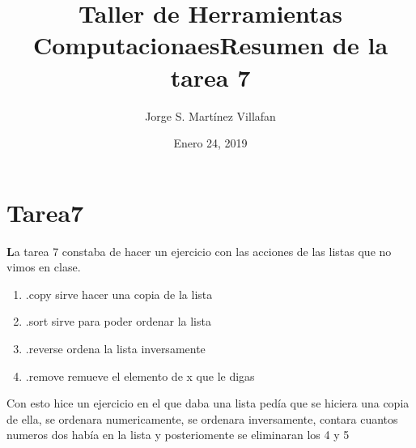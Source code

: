 \documentclass[letterpaper, 12pt, oneside]{article}%
\title{\Huge Taller de Herramientas Computacionaes}
\author{Jorge S. Martínez Villafan}
\date{Enero 24, 2019}
\begin{document}
\maketitle
\newpage
\title{Resumen de la tarea 7}
\section{Tarea7}
\textbf La tarea 7 constaba de hacer un ejercicio con las acciones de las listas que no vimos en clase.\\
\begin{enumerate}
	\item \color{red} .copy \color{black} sirve hacer una copia de la lista
	\item \color{red} .sort \color{black} sirve para poder ordenar la lista
	\item \color{red} .reverse \color{black} ordena la lista inversamente
	\item \color{red} .remove \color{black} remueve el elemento de x que le digas
\end{enumerate}
Con esto hice un ejercicio en el que daba una lista pedía que se hiciera una copia de ella, se ordenara numericamente, se ordenara inversamente, contara cuantos numeros dos había en la lista y posteriomente se eliminaran los 4 y 5
\end{document}
